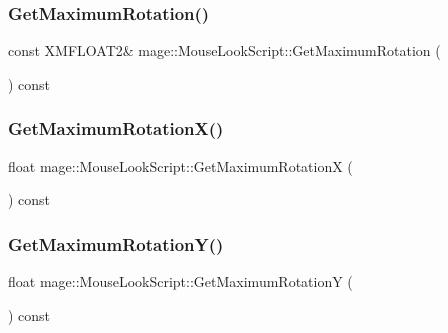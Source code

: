 \subsubsection{\texorpdfstring{Get\+Maximum\+Rotation()}{GetMaximumRotation()}}
{\footnotesize\ttfamily const X\+M\+F\+L\+O\+A\+T2\& mage\+::\+Mouse\+Look\+Script\+::\+Get\+Maximum\+Rotation (\begin{DoxyParamCaption}{ }\end{DoxyParamCaption}) const\hspace{0.3cm}{\ttfamily [noexcept]}}

\hypertarget{classmage_1_1_mouse_look_script_ad9ba164d80ed752e64cd7b0275a21460}{}\label{classmage_1_1_mouse_look_script_ad9ba164d80ed752e64cd7b0275a21460} 
\subsubsection{\texorpdfstring{Get\+Maximum\+Rotation\+X()}{GetMaximumRotationX()}}
{\footnotesize\ttfamily float mage\+::\+Mouse\+Look\+Script\+::\+Get\+Maximum\+RotationX (\begin{DoxyParamCaption}{ }\end{DoxyParamCaption}) const\hspace{0.3cm}{\ttfamily [noexcept]}}

\hypertarget{classmage_1_1_mouse_look_script_a9650ed4b2592e89fc8428b3a7dde1029}{}\label{classmage_1_1_mouse_look_script_a9650ed4b2592e89fc8428b3a7dde1029} 
\subsubsection{\texorpdfstring{Get\+Maximum\+Rotation\+Y()}{GetMaximumRotationY()}}
{\footnotesize\ttfamily float mage\+::\+Mouse\+Look\+Script\+::\+Get\+Maximum\+RotationY (\begin{DoxyParamCaption}{ }\end{DoxyParamCaption}) const\hspace{0.3cm}{\ttfamily [noexcept]}}

\hypertarget{classmage_1_1_mouse_look_script_a9bfb1bd2c5f4b6b2163a40782b5ac7fd}{}\label{classmage_1_1_mouse_look_script_a9bfb1bd2c5f4b6b2163a40782b5ac7fd} 
